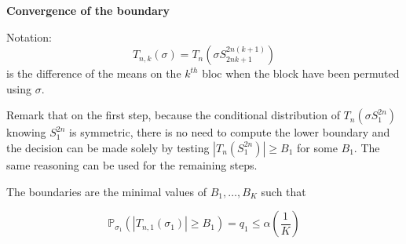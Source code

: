 \documentclass{article}
\theoremstyle{plain}
\theoremstyle{remark}
\renewcommand{\P}{\mathbb{P}}
\newcommand{\1}{\mathbbm{1}}
\numberwithin{equation}{section}
\begin{document}

\textbf{Convergence of the boundary}

Notation:
$$T_{n,k}(\sigma)=T_n\left(\sigma S_{2nk+1}^{2n(k+1)}\right) $$
is the difference of the means on the $k^{th}$ bloc when the block have been permuted using $\sigma$.

Remark that on the first step, because the conditional distribution of $T_n(\sigma S_1^{2n})$ knowing $S_1^{2n}$ is symmetric, there is no need to compute the lower boundary and the decision can be made solely by testing $|T_n(S_1^{2n})|\ge B_1$ for some $B_1$. The same reasoning can be used for the remaining steps.

The boundaries are the minimal values of $B_1,\dots, B_K$ such that

$$\P_{\sigma_1}(|T_{n,1}(\sigma_1)|\ge B_1) = q_1 \le \alpha\left(\frac{1}{K}\right) $$
\end{document}
